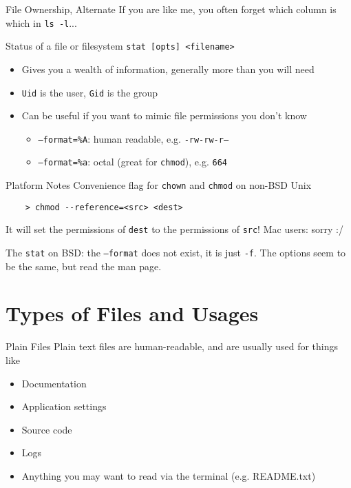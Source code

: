 \documentclass[11pt]{beamer}
\newcommand{\colbf}[1]{\textcolor{mLightBrown!77!black}{#1}}%
\def\wl{\par \vspace{\baselineskip}}                        %
\begin{document}
\begin{frame}[fragile]{File Ownership, Alternate}
  If you are like me, you often forget which column is which in \texttt{ls -l}...\wl

  \begin{block}{\colbf{Stat}us of a file or filesystem}
    \texttt{stat [opts] <filename>}
    \begin{itemize}
      \item Gives you a wealth of information, generally more than you will need
      \item \texttt{Uid} is the user, \texttt{Gid} is the group
      \item Can be useful if you want to mimic file permissions you don't know
      \begin{itemize}
        \item \texttt{--format=\%A}: human readable, e.g. \texttt{-rw-rw-r--}
        \item \texttt{--format=\%a}: octal (great for \texttt{chmod}), e.g. \texttt{664}
      \end{itemize}
    \end{itemize}
  \end{block}
\end{frame}

\begin{frame}[fragile]{Platform Notes}
  Convenience flag for \texttt{chown} and \texttt{chmod} on non-BSD Unix

  \begin{verbatim}
    > chmod --reference=<src> <dest>
  \end{verbatim}

  It will set the permissions of \texttt{dest} to the permissions of \texttt{src}!
  Mac users: sorry :/

  The \texttt{stat} on BSD: the \texttt{--format} does not exist, it is just \texttt{-f}.  The options seem
  to be the same, but read the man page.
\end{frame}

%

%
\section{Types of Files and Usages}
\label{sec:types_of_files}

\begin{frame}[fragile]{Plain Files}
  Plain text files are human-readable, and are usually used for things like
  \begin{itemize}[<+- | alert@+>]
    \item Documentation
    \item Application settings
    \item Source code
    \item Logs
    \item Anything you may want to read via the terminal (e.g. README.txt)
  \end{itemize}
\end{frame}
\end{document}
